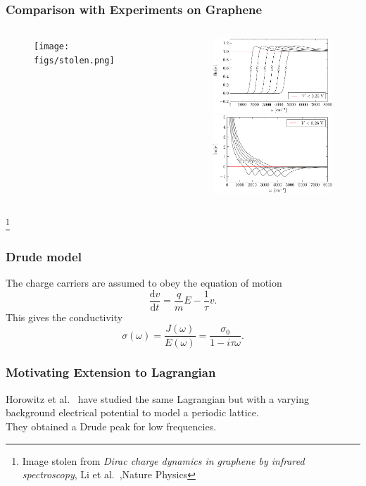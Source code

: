 \documentclass{beamer}
\renewcommand{\d}{\ensuremath{\mathrm{d}}}
\renewcommand{\i}{\ensuremath{i}}
\begin{document}
\begin{frame}
\frametitle{Comparison with Experiments on Graphene}
\begin{columns}
\begin{column}{6cm}
\begin{figure}
\centering
\texttt{[image: figs/stolen.png]}
\end{figure}
\end{column}
\begin{column}{6cm}
\begin{figure}
\centering
\includegraphics[width=5cm]{figs/graphene2_cond_re_a2_0.0-crop.pdf}\\
\includegraphics[width=5cm]{figs/graphene2_cond_im_a2_0.0-crop.pdf}\\
\end{figure}
\end{column}
\end{columns}
\footnote{Image stolen from \emph{Dirac charge dynamics in graphene by infrared spectroscopy}, Li et al.~,Nature Physics}
\end{frame}

\begin{frame}
\frametitle{Drude model}
The charge carriers are assumed to obey the equation of motion
\begin{equation}
 \frac{\d v}{\d t}=\frac{q}{m}E-\frac{1}{\tau}v.
\end{equation}
This gives the conductivity
\begin{equation}
  \sigma(\omega)=\frac{J(\omega)}{E(\omega)}=\frac{\sigma_0}{1-\i\tau\omega}.
\end{equation}
\end{frame}

\begin{frame}
\frametitle{Motivating Extension to Lagrangian}
Horowitz et al.~\cite{horowitz} have studied the same Lagrangian but with a varying background electrical potential to model a periodic lattice.\\
\vspace{1cm }
They obtained a Drude peak for low frequencies.
\end{frame}
\end{document}
